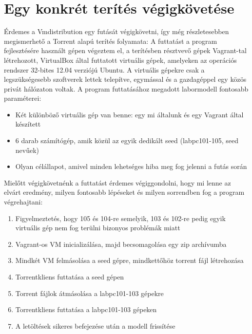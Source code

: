 \section{Egy konkrét terítés végigkövetése}

Érdemes a Vmdistribution egy futását végigkövetni, így még részletesebben megismerhető a Torrent alapú terítés folyamata:
A futtatást a program fejlesztésére használt gépen végeztem el, a terítésben résztvevő gépek Vagrant-tal létrehozott, VirtualBox által futtatott virtuális gépek, amelyeken az operációs rendszer 32-bites 12.04 verziójú Ubuntu\cite{ubuntu}. A virtuális gépekre csak a legszükségesebb szoftverek lettek telepítve, egymással és a gazdagéppel egy közös privát hálózaton voltak. A program futtatásához megadott labormodell fontosabb paraméterei:

\begin{itemize}
  \item Két különböző virtuális gép van benne: egy mi általunk és egy Vagrant által készített
  \item 6 darab számítógép, amik közül az egyik dedikált seed (labpc101-105, seed nevűek)
  \item Olyan célállapot, amivel minden lehetséges hiba meg fog jelenni a futás során
\end{itemize}

Mielőtt végigkövetnénk a futtatást érdemes végiggondolni, hogy mi lenne az elvárt eredmény, milyen fontosabb lépéseket és milyen sorrendben fog a program végrehajtani:

\begin{enumerate}
  \item Figyelmeztetés, hogy 105 és 104-re semelyik, 103 és 102-re pedig egyik virtuális gép nem fog terülni bizonyos problémák miatt
  \item Vagrant-os VM inicializálása, majd becsomagolása egy zip archívumba
  \item Mindkét VM felmásolása a seed gépre, mindkettőhöz torrent fájl létrehozása
  \item Torrentkliens futtatása a seed gépen
  \item Torrent fájlok átmásolása a labpc101-103 gépekre
  \item Torrentkliens futtatása a labpc101-103 gépeken
  \item A letöltések sikeres befejezése után a modell frissítése
\end{enumerate}

